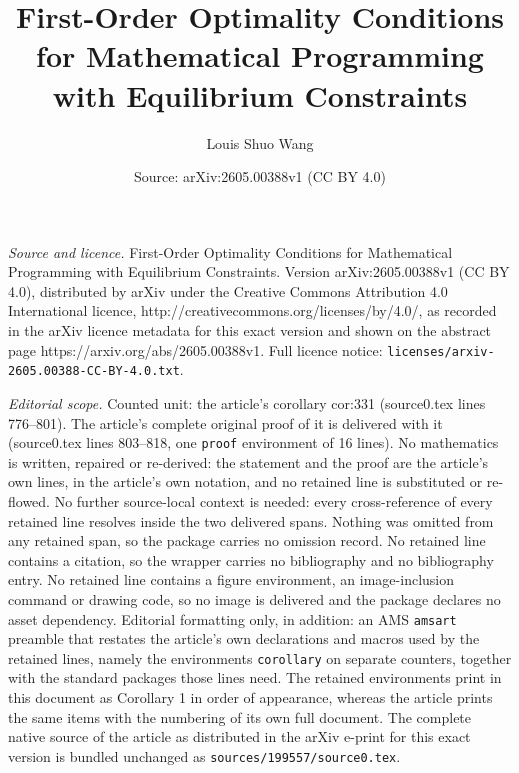 \documentclass[10pt,a4paper]{amsart}
\title{First-Order Optimality Conditions for Mathematical Programming with Equilibrium Constraints}
\author{Louis Shuo Wang}
\date{Source: arXiv:2605.00388v1 (CC BY 4.0)}
\begin{document}
\maketitle

\noindent\emph{Source and licence.} First-Order Optimality Conditions for Mathematical Programming with Equilibrium Constraints. Version arXiv:2605.00388v1 (CC BY 4.0), distributed by arXiv under the Creative Commons Attribution 4.0 International licence, http://creativecommons.org/licenses/by/4.0/, as recorded in the arXiv licence metadata for this exact version and shown on the abstract page https://arxiv.org/abs/2605.00388v1. Full licence notice: \texttt{licenses/arxiv-2605.00388-CC-BY-4.0.txt}.\par\smallskip

\noindent\textit{Editorial scope.} Counted unit: the article's corollary cor:331 (source0.tex lines 776--801). The article's complete original proof of it is delivered with it (source0.tex lines 803--818, one \texttt{proof} environment of 16 lines). No mathematics is written, repaired or re-derived: the statement and the proof are the article's own lines, in the article's own notation, and no retained line is substituted or re-flowed.  No further source-local context is needed: every cross-reference of every retained line resolves inside the two delivered spans.  Nothing was omitted from any retained span, so the package carries no omission record.  No retained line contains a citation, so the wrapper carries no bibliography and no bibliography entry.  No retained line contains a figure environment, an image-inclusion command or drawing code, so no image is delivered and the package declares no asset dependency.  Editorial formatting only, in addition: an AMS \texttt{amsart} preamble that restates the article's own declarations and macros used by the retained lines, namely the environments \texttt{corollary} on separate counters, together with the standard packages those lines need.  The retained environments print in this document as Corollary 1 in order of appearance, whereas the article prints the same items with the numbering of its own full document.  The complete native source of the article as distributed in the arXiv e-print for this exact version is bundled unchanged as \texttt{sources/199557/source0.tex}.
\end{document}
